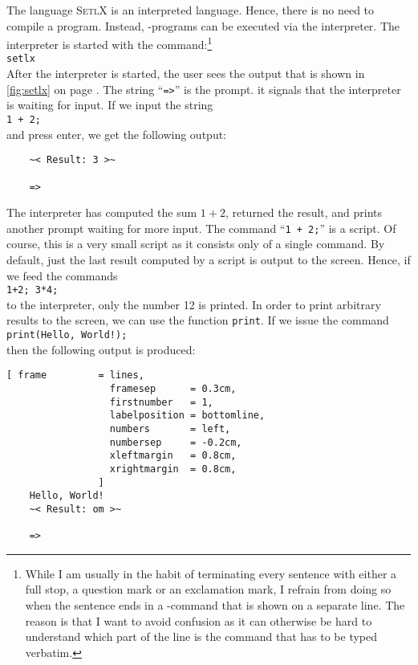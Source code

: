 The language \textsc{SetlX} is an interpreted language.  Hence, there is no need to compile a
program.  Instead, \setl-programs can be executed via the interpreter.  The interpreter is started
with the command:\footnote{
  While I am usually in the habit of terminating every sentence with either a full stop, a question
  mark or an exclamation mark, I refrain from doing so when the sentence ends in a \setl-command
  that is shown on a separate line.  The reason is that I want to avoid confusion as it can
  otherwise be hard to understand which part of the line is the command that has to be typed
  verbatim.
}
\\[0.2cm]
\hspace*{1.3cm}
\texttt{setlx}
\\[0.2cm]
After the interpreter is started, the user sees the output that is shown in 
\ref{fig:setlx} on page \pageref{fig:setlx}.  The string
``\texttt{=>}'' is the prompt.  it signals that the interpreter is waiting for input.
If we input the string
\\[0.2cm]
\hspace*{1.3cm}
\texttt{1 + 2;}
\\[0.2cm]
and press enter, we get the following output:
\begin{verbatim}
    ~< Result: 3 >~
    
    => 
\end{verbatim}
The interpreter has computed the sum $1+2$, returned the result, and prints another prompt waiting
for more input.  The command ``\texttt{1 + 2;}''
is a script.  Of course, this is a very small script as it consists only of a single command.
By default, just the last result computed by a script is output to the screen.  Hence, if we feed
the commands
\\[0.2cm]
\hspace*{1.3cm}
\texttt{1+2; 3*4;}
\\[0.2cm]
to the interpreter, only the number 12 is printed.  In order to print arbitrary results to
the screen, we can use the function \texttt{print}.  If we issue the command
\\[0.2cm]
\hspace*{1.3cm}
\texttt{print(Hello, World!);}
\\[0.2cm]
then the following output is produced:
\begin{Verbatim}[ frame         = lines, 
                  framesep      = 0.3cm, 
                  firstnumber   = 1,
                  labelposition = bottomline,
                  numbers       = left,
                  numbersep     = -0.2cm,
                  xleftmargin   = 0.8cm,
                  xrightmargin  = 0.8cm,
                ]
    Hello, World!
    ~< Result: om >~
    
    => 
\end{Verbatim}

